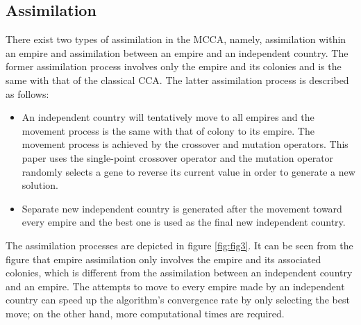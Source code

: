 \subsection{Assimilation}
There exist two types of assimilation in the MCCA, namely, assimilation within an empire and assimilation between an empire and an independent country.
The former assimilation process involves only the empire and its colonies and is the same with that of the classical CCA.
The latter assimilation process is described as follows:
\begin{itemize}
	\item An independent country will tentatively move to all empires and the movement process is the same with that of colony to its empire.
	The movement process is achieved by the crossover and mutation operators.
	This paper uses the single-point crossover operator and the mutation operator randomly selects a gene to reverse its current value in order to generate a new solution.
	\item Separate new independent country is generated after the movement toward every empire and the best one is used as the final new independent country.
\end{itemize}

The assimilation processes are depicted in figure \ref{fig:fig3}.
It can be seen from the figure that empire assimilation only involves the empire and its associated colonies, which is different from the assimilation between an independent country and an empire.
The attempts to move to every empire made by an independent country can speed up the algorithm's convergence rate by only selecting the best move; on the other hand, more computational times are required.

